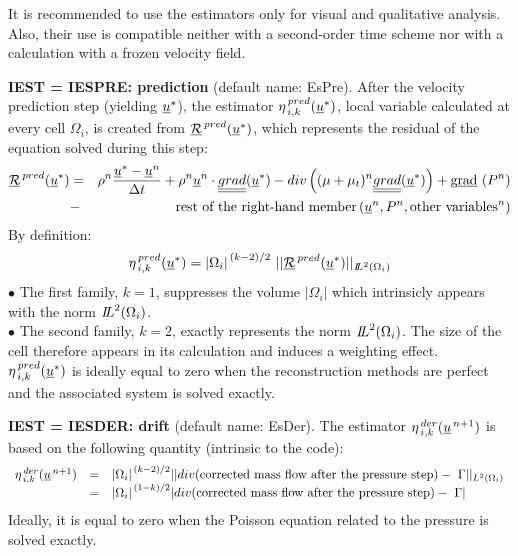 It is recommended to use the estimators only for visual and qualitative
analysis. Also, their use is compatible neither with a second-order time scheme
nor with a calculation with a frozen velocity field.

{\bf IEST = IESPRE: prediction} (default name: EsPre).
After the velocity prediction step (yielding $\underline{u}^*$), the
estimator $\eta^{\,pred}_{\,i,k}(\underline{u}^*)$, local variable calculated
at every cell $\Omega_i$, is created from $\underline{\mathcal
R}^{\,pred}(\underline{u}^*)$, which represents the residual of the equation
solved during this step:
\begin{eqnarray*}
\underline{\mathcal R}^{\,pred}(\underline{u}^*)&= & \rho^n \frac{\underline{u}^*-\underline{u}^n}{\Delta t}
              + \rho^n \underline{u}^n \cdot \underline{\underline{grad}}(\underline{u}^*)
              - div \left((\mu+\mu_t)^n \underline{\underline{grad}}(\underline{u}^*) \right)
              + \text{g}\underline{\text{rad}}\ (P^n)     \\
              &- &\text{rest of the right-hand member}
                        \,(\underline{u}^n, P^n, \text{other variables}^n)
\end{eqnarray*}
By definition:
$$ \eta^{\,pred}_{\,i,k}(\underline{u}^*)= {|\Omega_i|}^{\,(k-2)/2}\ ||\underline{\mathcal R}^{\,pred}(\underline{u}^*)||
_{{I\hspace{-.25em}L}^{2}(\Omega_i)}$$
\hspace*{0.5cm}$\bullet$ The first family, $k=1$, suppresses the
volume $|\Omega_i|$ which intrinsicly appears  with the norm
${{I\hspace{-.25em}L}^{2}(\Omega_i)}$.\\
\hspace*{0.5cm}$\bullet$ The second family, $k=2$, exactly represents the norm
${{I\hspace{-.25em}L}^{2}(\Omega_i)}$. The size of the cell therefore
appears in its calculation and induces a weighting effect.\\
$ \eta^{\,pred}_{\,i,k}(\underline{u}^*)$  is ideally equal to zero when the
reconstruction methods are perfect and the associated system is
solved exactly.

{\bf IEST = IESDER: drift}  (default name: EsDer).
The estimator $\eta^{\,der}_{\,i,k}(\underline{u}^{\,n+1})$ is based on the
following quantity (intrinsic to the code):
\begin{equation}
\begin{array}{lll}
 \eta^{\,der}_{\,i,k}(\vect{u}^{\,n+1})
&=& {|\Omega_i|}^{\,(k-2)/2}
||div (\text{corrected mass flow after the pressure step})
                                              -\ \Gamma||_{{L}^{2}(\Omega_i)} \\
&=& {|\Omega_i|}^{\,(1-k)/2}
|div (\text{corrected mass flow after the pressure step})-\ \Gamma|
\end{array}
\end{equation}
Ideally, it is equal to zero when the Poisson equation related to the pressure is
solved exactly.

